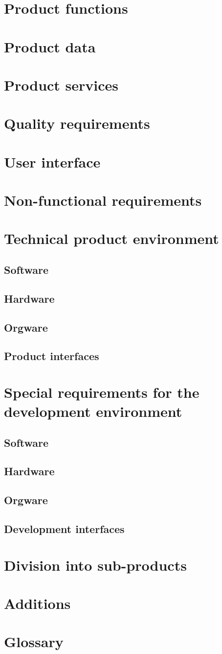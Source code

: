 \documentclass[]{article}
\begin{document}
\section{Product functions}
\section{Product data}
\section{Product services}
\section{Quality requirements}
\section{User interface}
\section{Non-functional requirements}
\section{Technical product environment}
	\subsection{Software}
	\subsection{Hardware}
	\subsection{Orgware}
	\subsection{Product interfaces}
\section{Special requirements for the development environment}
	\subsection{Software}
	\subsection{Hardware}
	\subsection{Orgware}
	\subsection{Development interfaces}
\section{Division into sub-products}
\section{Additions}
\section{Glossary}
\end{document}
